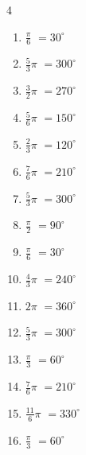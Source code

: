 \begin{multicols}{4}
\begin{enumerate}
  \item $\displaystyle \frac{\pi}{6}$
        $\displaystyle =30^{\circ}$

  \item $\displaystyle \frac{5}{3}\pi$
        $\displaystyle =300^{\circ}$

  \item $\displaystyle \frac{3}{2}\pi$
        $\displaystyle =270^{\circ}$

  \item $\displaystyle \frac{5}{6}\pi$
        $\displaystyle =150^{\circ}$

  \item $\displaystyle \frac{2}{3}\pi$
        $\displaystyle =120^{\circ}$

  \item $\displaystyle \frac{7}{6}\pi$
        $\displaystyle =210^{\circ}$

\columnbreak %

\resetques

  \item $\displaystyle \frac{5}{3}\pi$
        $\displaystyle =300^{\circ}$

  \item $\displaystyle \frac{\pi}{2}$
        $\displaystyle =90^{\circ}$

  \item $\displaystyle \frac{\pi}{6}$
        $\displaystyle =30^{\circ}$

  \item $\displaystyle \frac{4}{3}\pi$
        $\displaystyle =240^{\circ}$

  \item $\displaystyle 2\pi$
        $\displaystyle =360^{\circ}$

  \item $\displaystyle \frac{5}{3}\pi$
        $\displaystyle =300^{\circ}$

  \item $\displaystyle \frac{\pi}{3}$
        $\displaystyle =60^{\circ}$

  \item $\displaystyle \frac{7}{6}\pi$
        $\displaystyle =210^{\circ}$

  \item $\displaystyle \frac{11}{6}\pi$
        $\displaystyle =330^{\circ}$

  \item $\displaystyle \frac{\pi}{3}$
        $\displaystyle =60^{\circ}$


\end{enumerate}
\end{multicols}
